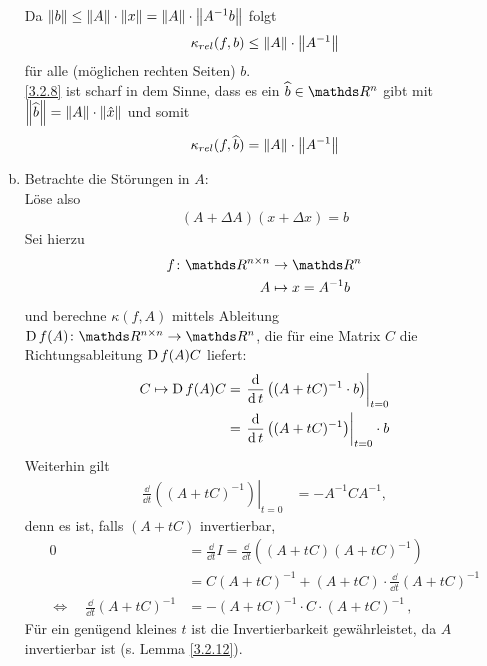 \begin{Bspe}
\begin{enumerate}[a)]
    Da $\nn[b] \leq \nn[A]\cdot\nn[x] = \nn[A]\cdot \nn[A^{-1}b]$ folgt
    \begin{gather}
      \kappa_{rel}(f,b) \leq \nn[A] \cdot \nn[A^{-1}] \label{III.2.8}
    \end{gather}
    für alle (möglichen rechten Seiten) $b $.\\
    \ref{3.2.8} ist scharf in dem Sinne, dass es ein $\widehat{b}\in \R^n$ gibt 
    mit $\nn[\widehat{b}] = \nn[A]\cdot \nn[\hat{x}]$ und somit
    \begin{gather*}
      \kappa_{rel}(f,\widehat{b}) = \nn[A]\cdot \nn[ A^{-1}]
    \end{gather*}
  \item Betrachte die Störungen in $A$:\\
    Löse also 
    \begin{gather*}
      (A+\Delta A)(x+\Delta x) = b
    \end{gather*}
    Sei hierzu
    \begin{align*}
      f\colon \R^{n\times n}&\to\R^n\\
      A&\mapsto x= A^{-1}b 
    \end{align*}
    und berechne $\kappa(f,A)$ mittels Ableitung
    $\D f(A)\colon\R^{n\times n}\to \R^n$, die für eine Matrix $C$ 
    die Richtungsableitung $\D f(A)C$ liefert:
    \begin{align*}
      C\mapsto \D f(A) C
      &=  \left.
        \frac{\dd}{\dd t}\left((A+tC)^{-1} \cdot b\right)
        \right|_{t=0} \\
      & = \left.
        \frac{\dd}{\dd t}\left((A+tC)^{-1}\right)
        \right|_{t=0}\cdot b
    \end{align*}			
    Weiterhin gilt
    \begin{align}
      \left. \frac{\dd}{\dd t} \left((A+tC)^{-1}\right) \right|_{t=0} 
      &=-A^{-1}CA^{-1},
        \label{III.2.9}
    \end{align}
    denn es ist, falls $(A+tC)$ invertierbar,
    \begin{align*}
      0 &= \frac{\dd}{\dd t}I
          = \frac{\dd}{\dd t}\left( (A+tC)(A+tC)^{-1}\right)\\
        &= C(A+tC)^{-1} +(A+tC)\cdot \frac{\dd}{\dd t}(A+tC)^{-1} \\
      \Longleftrightarrow\quad \frac{\dd}{\dd t} (A+ tC)^{-1} 
        &= -(A+tC)^{-1} \cdot C\cdot (A+tC)^{-1} \, ,
    \end{align*}
    Für ein genügend kleines $t$ ist die Invertierbarkeit
    gewährleistet, da $A$ invertierbar ist (s. Lemma \ref{3.2.12}).

\end{enumerate}
\end{Bspe}
